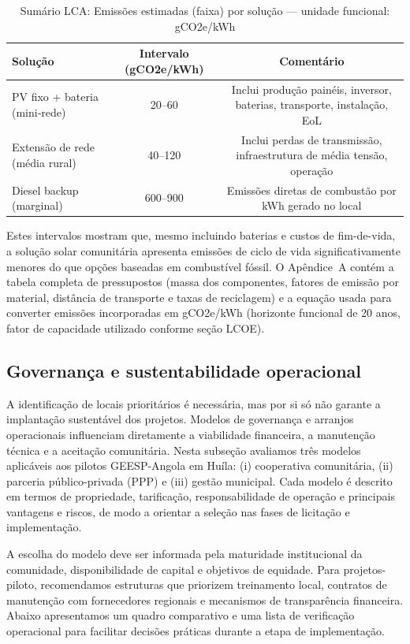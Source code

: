 \documentclass[12pt, a4paper]{article}
\begin{document}
\begin{itemize}
\begin{table}[ht]
\centering
\caption{Sumário LCA: Emissões estimadas (faixa) por solução — unidade funcional: gCO2e/kWh}
\label{tab:lca_summary}
\begin{tabular}{lcc}
\toprule
\textbf{Solução} & \textbf{Intervalo (gCO2e/kWh)} & \textbf{Comentário} \\
\midrule
PV fixo + bateria (mini‑rede) & 20--60 & Inclui produção painéis, inversor, baterias, transporte, instalação, EoL \\
Extensão de rede (média rural) & 40--120 & Inclui perdas de transmissão, infraestrutura de média tensão, operação \\
Diesel backup (marginal) & 600--900 & Emissões diretas de combustão por kWh gerado no local \\
\bottomrule
\end{tabular}
\end{table}

Estes intervalos mostram que, mesmo incluindo baterias e custos de fim-de-vida, a solução
solar comunitária apresenta emissões de ciclo de vida significativamente menores do que
opções baseadas em combustível fóssil. O Apêndice~A contém a tabela completa de pressupostos
(massa dos componentes, fatores de emissão por material, distância de transporte e taxas de
reciclagem) e a equação usada para converter emissões incorporadas em gCO2e/kWh (horizonte
funcional de 20 anos, fator de capacidade utilizado conforme seção LCOE).


\subsection{Governança e sustentabilidade operacional}

A identificação de locais prioritários é necessária, mas por si só não garante a
implantação sustentável dos projetos. Modelos de governança e arranjos operacionais
influenciam diretamente a viabilidade financeira, a manutenção técnica e a aceitação
comunitária. Nesta subseção avaliamos três modelos aplicáveis aos pilotos GEESP-Angola
em Huíla: (i) cooperativa comunitária, (ii) parceria público-privada (PPP) e (iii)
gestão municipal. Cada modelo é descrito em termos de propriedade, tarificação,
responsabilidade de operação e principais vantagens e riscos, de modo a orientar a
seleção nas fases de licitação e implementação.

A escolha do modelo deve ser informada pela maturidade institucional da comunidade,
disponibilidade de capital e objetivos de equidade. Para projetos-piloto, recomendamos
estruturas que priorizem treinamento local, contratos de manutenção com fornecedores
regionais e mecanismos de transparência financeira. Abaixo apresentamos um quadro
comparativo e uma lista de verificação operacional para facilitar decisões práticas
durante a etapa de implementação.


\end{itemize}
\end{document}
